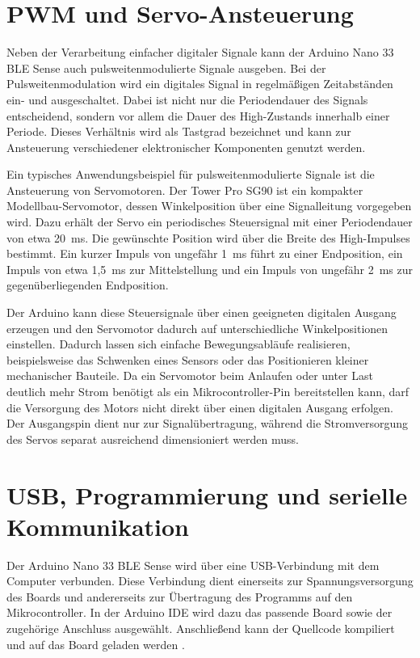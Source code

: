 \section{PWM und Servo-Ansteuerung}

Neben der Verarbeitung einfacher digitaler Signale kann der Arduino Nano 33 BLE Sense auch pulsweitenmodulierte Signale ausgeben. Bei der Pulsweitenmodulation wird ein digitales Signal in regelmä\ss igen Zeitabständen ein- und ausgeschaltet. Dabei ist nicht nur die Periodendauer des Signals entscheidend, sondern vor allem die Dauer des High-Zustands innerhalb einer Periode. Dieses Verhältnis wird als Tastgrad bezeichnet und kann zur Ansteuerung verschiedener elektronischer Komponenten genutzt werden\cite{ArduinoPWM:2026}.

Ein typisches Anwendungsbeispiel für pulsweitenmodulierte Signale ist die Ansteuerung von Servomotoren. Der Tower Pro SG90 ist ein kompakter Modellbau-Servomotor, dessen Winkelposition über eine Signalleitung vorgegeben wird. Dazu erhält der Servo ein periodisches Steuersignal mit einer Periodendauer von etwa 20~ms. Die gewünschte Position wird über die Breite des High-Impulses bestimmt. Ein kurzer Impuls von ungefähr 1~ms führt zu einer Endposition, ein Impuls von etwa 1{,}5~ms zur Mittelstellung und ein Impuls von ungefähr 2~ms zur gegenüberliegenden Endposition.


Der Arduino kann diese Steuersignale über einen geeigneten digitalen Ausgang erzeugen und den Servomotor dadurch auf unterschiedliche Winkelpositionen einstellen. Dadurch lassen sich einfache Bewegungsabläufe realisieren, beispielsweise das Schwenken eines Sensors oder das Positionieren kleiner mechanischer Bauteile. Da ein Servomotor beim Anlaufen oder unter Last deutlich mehr Strom benötigt als ein Mikrocontroller-Pin bereitstellen kann, darf die Versorgung des Motors nicht direkt über einen digitalen Ausgang erfolgen. Der Ausgangspin dient nur zur Signalübertragung, während die Stromversorgung des Servos separat ausreichend dimensioniert werden muss\cite{ArduinoSP:2026}.


\section{USB, Programmierung und serielle Kommunikation}

Der Arduino Nano 33 BLE Sense wird über eine USB-Verbindung mit dem Computer verbunden. Diese Verbindung dient einerseits zur Spannungsversorgung des Boards und andererseits zur Übertragung des Programms auf den Mikrocontroller. In der Arduino IDE wird dazu das passende Board sowie der zugehörige Anschluss ausgewählt. Anschlie\ss end kann der Quellcode kompiliert und auf das Board geladen werden \cite{ArduinoGS:2026}.

